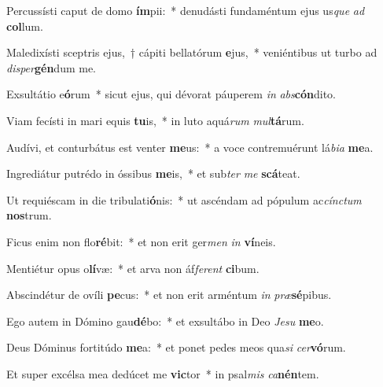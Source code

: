 \item Percussísti caput de domo \textbf{ím}pii:~* denudásti fundaméntum ejus us\textit{que} \textit{ad} \textbf{col}lum.
\item Maledixísti sceptris ejus,~† cápiti bellatórum \textbf{e}jus,~* veniéntibus ut turbo ad \textit{di}\textit{sper}\textbf{gén}dum me.
\item Exsultátio e\textbf{ó}rum~* sicut ejus, qui dévorat páuperem \textit{in} \textit{abs}\textbf{cón}dito.
\item Viam fecísti in mari equis \textbf{tu}is,~* in luto aquá\textit{rum} \textit{mul}\textbf{tá}rum.
\item Audívi, et conturbátus est venter \textbf{me}us:~* a voce contremuérunt lá\textit{bi}\textit{a} \textbf{me}a.
\item Ingrediátur putrédo in óssibus \textbf{me}is,~* et sub\textit{ter} \textit{me} \textbf{scá}teat.
\item Ut requiéscam in die tribulati\textbf{ó}nis:~* ut ascéndam ad pópulum ac\textit{cínc}\textit{tum} \textbf{nos}trum.
\item Ficus enim non flo\textbf{ré}bit:~* et non erit ger\textit{men} \textit{in} \textbf{ví}neis.
\item Mentiétur opus o\textbf{lí}væ:~* et arva non áf\textit{fe}\textit{rent} \textbf{ci}bum.
\item Abscindétur de ovíli \textbf{pe}cus:~* et non erit arméntum \textit{in} \textit{præ}\textbf{sé}pibus.
\item Ego autem in Dómino gau\textbf{dé}bo:~* et exsultábo in Deo \textit{Je}\textit{su} \textbf{me}o.
\item Deus Dóminus fortitúdo \textbf{me}a:~* et ponet pedes meos qua\textit{si} \textit{cer}\textbf{vó}rum.
\item Et super excélsa mea dedúcet me \textbf{vic}tor~* in psal\textit{mis} \textit{ca}\textbf{nén}tem.
